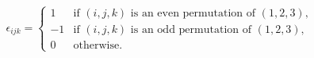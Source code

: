 \documentclass[preview]{standalone}
\begin{document}
\begin{align*}
\epsilon_{ijk} = \begin{cases} 1 & \text{if } (i,j,k) \text{ is an even permutation of } (1,2,3), \\ -1 & \text{if } (i,j,k) \text{ is an odd permutation of } (1,2,3), \\ 0 & \text{otherwise.} \end{cases}
\end{align*}
\end{document}
